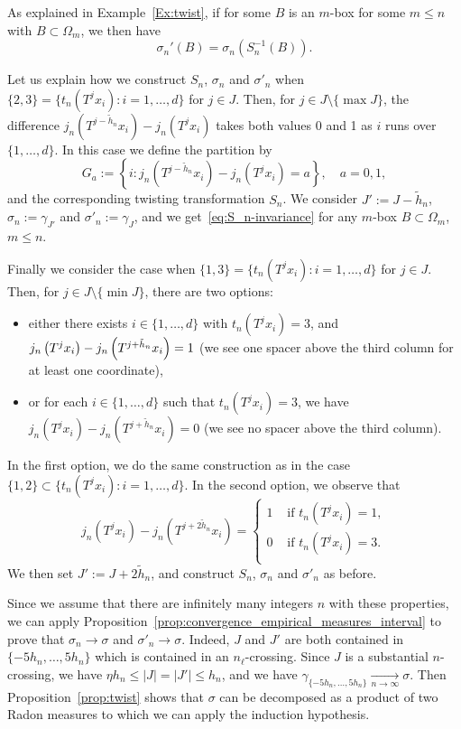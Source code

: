 \documentclass[AHL,Unicode,longabstracts]{cedram}
\newcommand{\egdef}{:=}
\newcommand{\tend}[3][]{\xrightarrow[#2\to#3]{#1}}
\newcommand{\ovC}{\Omega}
\begin{document}
As explained in Example~\ref{Ex:twist}, if for some $B$ is an $m$-box for some $m\le n$ with $B\subset \ovC_m$, we then have
\begin{equation}\label{eq:S_n-invariance}
\sigma_n'(B)=\sigma_n(S_n^{-1}(B)).
\end{equation}


Let us explain how we construct $S_n$, $\sigma_n$ and $\sigma'_n$ when $\{2,3\}= \{t_n(T^j x_i):i=1,\ldots,d\}$ for $j\in J$. Then, for $j\in J\setminus\{\max J\}$, the difference $j_n\left(T^{j-\tilde h_n}x_i\right) - j_n\left(T^{j}x_i\right)$ takes both values 0 and 1 as $i$ runs over $\{1,\ldots,d\}$. In this case we define the partition by
\[
G_a\egdef \left\{i: j_n\left(T^{j-\tilde h_n}x_i\right) - j_n\left(T^{j}x_i\right) = a\right\}, \quad a=0,1,
\]
and the corresponding twisting transformation $S_n$. We consider $J'\egdef J-\tilde h_n$, $\sigma_n\egdef \gamma_{J'}$ and $\sigma'_n\egdef \gamma_{J}$, and we get~\eqref{eq:S_n-invariance} for any $m$-box $B\subset \ovC_m$, $m\le n$.

Finally we consider the case when $\{1,3\}= \{t_n(T^j x_i):i=1,\ldots,d\}$ for $j\in J$. Then, for $j\in J\setminus\{\min J\}$, there are two options:
\begin{itemize}
\item either there exists $i\in\{1,\ldots,d\}$ with $t_n(T^jx_i)=3$, and $j_n\left(T^{j}x_i\right) -\linebreak j_n\left(T^{j+\tilde h_n }x_i\right)=1$ (we see one spacer above the third column for at least one coordinate),
\item or for each $i\in\{1,\ldots,d\}$ such that $t_n(T^jx_i)=3$, we have $j_n\left(T^{j}x_i\right) - j_n\left(T^{j+\tilde h_n }x_i\right)=0$ (we see no spacer above the third column).
\end{itemize}
In the first option, we do the same construction as in the case $\{1,2\}\subset \{t_n(T^j x_i):i=1,\ldots,d\}$. In the second option, we observe that
\[
j_n\left(T^{j}x_i\right) - j_n\left(T^{j+2\tilde h_n }x_i\right) =
\begin{cases}
1 & \text{ if }t_n(T^jx_i)=1,\\
0 & \text{ if }t_n(T^jx_i)=3.\\
\end{cases}
\]
We then set $J'\egdef J+2\tilde h_n $, and construct $S_n$, $\sigma_n$ and $\sigma'_n$ as before.

Since we assume that there are infinitely many integers $n$ with these properties, we can apply Proposition~\ref{prop:convergence_empirical_measures_interval} to prove that $\sigma_n\to\sigma$ and $\sigma'_n\to\sigma$. Indeed, $J$ and $J'$ are both contained in $\{-5 h_n,\ldots,5 h_n\}$ which is contained in an $n_\ell$-crossing. Since $J$ is a substantial $n$-crossing, we have $\eta h_n\le |J|=|J'| \le h_n$, and we have $\gamma_{\{-5 h_n,\ldots,5 h_n\}}\tend{n}{\infty}\sigma$. Then Proposition~\ref{prop:twist} shows that $\sigma$ can be decomposed as a product of two Radon measures to which we can apply the induction hypothesis.
\end{document}
